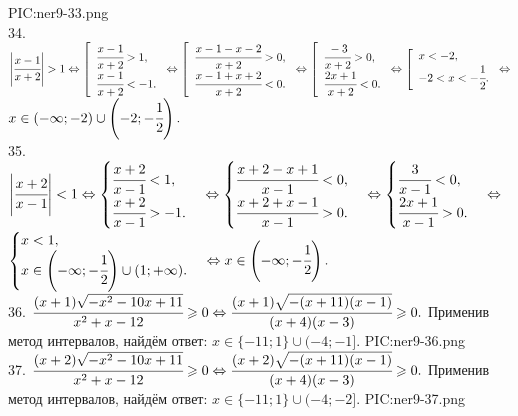 {{PIC:ner9-33.png}}\\
34. $\left|\cfrac{x-1}{x+2}\right|>1\Leftrightarrow \left[\begin{array}{l} \cfrac{x-1}{x+2}>1,\\ \cfrac{x-1}{x+2}<-1.\end{array}\right.\Leftrightarrow
\left[\begin{array}{l} \cfrac{x-1-x-2}{x+2}>0,\\ \cfrac{x-1+x+2}{x+2}<0.\end{array}\right.\Leftrightarrow
\left[\begin{array}{l} \cfrac{-3}{x+2}>0,\\ \cfrac{2x+1}{x+2}<0.\end{array}\right.\Leftrightarrow
\left[\begin{array}{l} x<-2,\\ -2<x<-\cfrac{1}{2}.\end{array}\right.\Leftrightarrow$\\$
 x\in (-\infty;-2)\cup\left(-2;-\cfrac{1}{2}\right).$\\
35. $\left|\cfrac{x+2}{x-1}\right|<1\Leftrightarrow \begin{cases} \cfrac{x+2}{x-1}<1,\\ \cfrac{x+2}{x-1}>-1.\end{cases}\Leftrightarrow
\begin{cases} \cfrac{x+2-x+1}{x-1}<0,\\ \cfrac{x+2+x-1}{x-1}>0.\end{cases}\Leftrightarrow
\begin{cases} \cfrac{3}{x-1}<0,\\ \cfrac{2x+1}{x-1}>0.\end{cases}\Leftrightarrow$\\$
\begin{cases} x<1,\\ x\in\left(-\infty;-\cfrac{1}{2}\right)\cup(1;+\infty).\end{cases}\Leftrightarrow
 x\in \left(-\infty;-\cfrac{1}{2}\right).$\\
36. $\cfrac{(x+1)\sqrt{-x^2-10x+11}}{x^2+x-12}\geqslant0\Leftrightarrow \cfrac{(x+1)\sqrt{-(x+11)(x-1)}}{(x+4)(x-3)}\geqslant0.$ Применив метод интервалов, найдём ответ: $x\in\{-11;1\}\cup(-4;-1].$
{{PIC:ner9-36.png}}\\
37. $\cfrac{(x+2)\sqrt{-x^2-10x+11}}{x^2+x-12}\geqslant0\Leftrightarrow\cfrac{(x+2)\sqrt{-(x+11)(x-1)}}{(x+4)(x-3)}\geqslant0.$ Применив метод интервалов, найдём ответ: $x\in\{-11;1\}\cup(-4;-2].$
{{PIC:ner9-37.png}}\\
